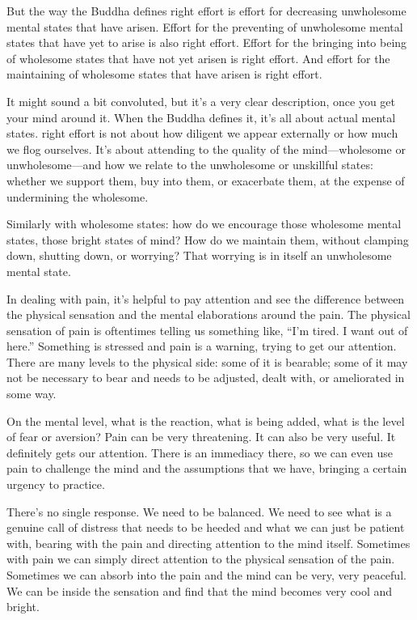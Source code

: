 But the way the Buddha defines right effort is effort for decreasing
unwholesome mental states that have arisen. Effort for the preventing of
unwholesome mental states that have yet to arise is also right effort.
Effort for the bringing into being of wholesome states that have not yet
arisen is right effort. And effort for the maintaining of wholesome
states that have arisen is right effort.

It might sound a bit convoluted, but it’s a very clear description, once
you get your mind around it. When the Buddha defines it, it’s all about
actual mental states. right effort is not about how diligent we appear
externally or how much we flog ourselves. It’s about attending to the
quality of the mind—wholesome or unwholesome—and how we relate to the
unwholesome or unskillful states: whether we support them, buy into
them, or exacerbate them, at the expense of undermining the wholesome.

Similarly with wholesome states: how do we encourage those wholesome
mental states, those bright states of mind? How do we maintain them,
without clamping down, shutting down, or worrying? That worrying is in
itself an unwholesome mental state.

In dealing with pain, it’s helpful to pay attention and see the
difference between the physical sensation and the mental elaborations
around the pain. The physical sensation of pain is oftentimes telling us
something like, “I’m tired. I want out of here.” Something is stressed
and pain is a warning, trying to get our attention. There are many
levels to the physical side: some of it is bearable; some of it may not
be necessary to bear and needs to be adjusted, dealt with, or
ameliorated in some way.

On the mental level, what is the reaction, what is being added, what is
the level of fear or aversion? Pain can be very threatening. It can also
be very useful. It definitely gets our attention. There is an immediacy
there, so we can even use pain to challenge the mind and the assumptions
that we have, bringing a certain urgency to practice.

There’s no single response. We need to be balanced. We need to see what
is a genuine call of distress that needs to be heeded and what we can
just be patient with, bearing with the pain and directing attention to
the mind itself. Sometimes with pain we can simply direct attention to
the physical sensation of the pain. Sometimes we can absorb into the
pain and the mind can be very, very peaceful. We can be inside the
sensation and find that the mind becomes very cool and bright.

